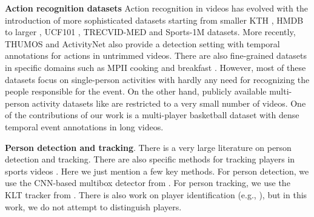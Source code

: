 \noindent \textbf{Action recognition datasets}
Action recognition in videos has evolved with the introduction of more
sophisticated datasets starting from smaller KTH \cite{Schuldt_ICPR04}, HMDB \cite{HMDB}
to larger , UCF101 \cite{UCF101}, TRECVID-MED \cite{MED11} and Sports-1M
\cite{Karpathy_CVPR14} datasets.  More recently, THUMOS \cite{THUMOS} and
ActivityNet \cite{ActivityNet} also provide a detection setting with temporal
annotations for actions in untrimmed videos.  There are also fine-grained
datasets in specific domains such as MPII cooking \cite{Finegrained_cooking}
and breakfast \cite{Breakfast}.  However, most of these datasets focus on
single-person activities with hardly any need for recognizing the people
responsible for the event. On the other hand, publicly available multi-person
activity datasets like \cite{Ryoo_10,Choi_ICCV09,VIRAT} are restricted to a very small
number of videos.  One of the contributions of our work is a multi-player
basketball dataset with dense temporal event annotations in long videos.

\noindent \textbf{Person detection and tracking}. There is a very
large literature on person detection and tracking.
There are also specific methods for tracking players in
sports videos \cite{Shitrit_ICCV11}.
Here we just mention a few key methods.
For person detection, we use the CNN-based multibox detector from
\cite{Szegedy13}. For person tracking, we use the KLT tracker from
\cite{Veenman_PAMI2001}.
There is also work on player identification (e.g., \cite{Lu2013}), but
in this work, we do not attempt to distinguish players.
